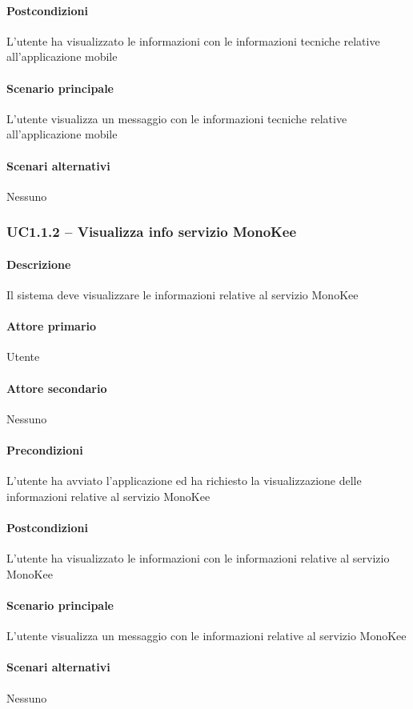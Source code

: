 \paragraph{Postcondizioni}  L’utente ha visualizzato le informazioni con le informazioni tecniche relative all’applicazione mobile
\paragraph{Scenario principale}  
L’utente visualizza un messaggio con le informazioni tecniche relative all’applicazione mobile
\paragraph{Scenari alternativi}  Nessuno


\subsubsection{UC1.1.2 – Visualizza info servizio MonoKee}
\paragraph{Descrizione}  Il sistema deve visualizzare le informazioni relative al servizio MonoKee
\paragraph{Attore primario}  Utente
\paragraph{Attore secondario}  Nessuno
\paragraph{Precondizioni}  L’utente ha avviato l’applicazione ed ha richiesto la visualizzazione delle informazioni relative al servizio MonoKee
\paragraph{Postcondizioni}  L’utente ha visualizzato le informazioni con le informazioni relative al servizio MonoKee
\paragraph{Scenario principale}  
L’utente visualizza un messaggio con le informazioni relative al servizio MonoKee
\paragraph{Scenari alternativi}  Nessuno


